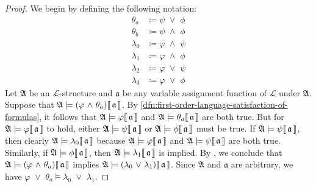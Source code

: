 \begin{proof}
    We begin by defining the following notation:
    \begin{align*}
        \theta_{a} &\coloneq \psi \,\,{\lor}\,\, \phi\\
        \theta_{b} &\coloneq \psi \,\,{\land}\,\, \phi\\
        \lambda_{0} &\coloneq \varphi \,\,{\land}\,\, \psi\\
        \lambda_{1} &\coloneq \varphi \,\,{\land}\,\, \phi\\
        \lambda_{2} &\coloneq \varphi \,\,{\lor}\,\, \psi\\
        \lambda_{3} &\coloneq \varphi \,\,{\lor}\,\, \phi
    \end{align*}
    Let \( \mathfrak{A} \) be an \( \mathcal{L} \)-structure and \( \mathfrak{a} \) be any variable assignment function of \( \mathcal{L} \) under \( \mathfrak{A} \).
    Suppose that \( \folwffsatisfaction{\mathfrak{A}}{\mleft( \varphi \,\,{\land}\,\, \theta_{a} \mright)}{\mathfrak{a}} \).
    By \cref{dfn:first-order-language-satisfaction-of-formulas}, it follows that \(  \mathfrak{A} \models \varphi\llbracket\, \mathfrak{a} \,\rrbracket \)
    and \(  \mathfrak{A} \models \theta_{a}\llbracket\, \mathfrak{a} \,\rrbracket \) are both true.
    But for \(  \mathfrak{A} \models \varphi\llbracket\, \mathfrak{a} \,\rrbracket \) to hold, either \(  \mathfrak{A} \models \psi\llbracket\, \mathfrak{a} \,\rrbracket \)
    or \(  \mathfrak{A} \models \phi\llbracket\, \mathfrak{a} \,\rrbracket \) must be true.
    If \(  \mathfrak{A} \models \psi\llbracket\, \mathfrak{a} \,\rrbracket \), then clearly \(  \mathfrak{A} \models \lambda_{0}\llbracket\, \mathfrak{a} \,\rrbracket \)
    because \(  \mathfrak{A} \models \varphi\llbracket\, \mathfrak{a} \,\rrbracket \) and \(  \mathfrak{A} \models \psi\llbracket\, \mathfrak{a} \,\rrbracket \) are both true.
    Similarly, if \(  \mathfrak{A} \models \phi\llbracket\, \mathfrak{a} \,\rrbracket \), then \(  \mathfrak{A} \models \lambda_{1}\llbracket\, \mathfrak{a} \,\rrbracket \)
    is implied.
    By , we conclude that
    \( \folwffsatisfaction{\mathfrak{A}}{\mleft( \varphi \,\,{\land}\,\, \theta_{a} \mright)}{\mathfrak{a}} \)
    implies \( \folwffsatisfaction{\mathfrak{A}}{\mleft( \lambda_{0} \,\,{\lor}\,\, \lambda_{1} \mright)}{\mathfrak{a}} \).
    Since \( \mathfrak{A} \) and \( \mathfrak{a} \) are arbitrary, we have \( \varphi \,\,{\lor}\,\, \theta_{a} \models \lambda_{0} \,\,{\lor}\,\, \lambda_{1} \).


\end{proof}
